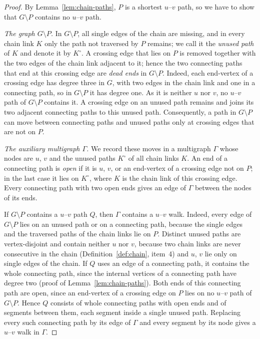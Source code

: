 \begin{proof}
By Lemma~\ref{lem:chain-paths}, $P$ is a shortest $u$--$v$ path, so we have to show that $G\setminus P$ contains no $u$--$v$ path.

\emph{The graph $G \setminus P$.}
In $G \setminus P$, all single edges of the chain are missing, and in every chain link $K$ only the path not traversed by $P$ remains; we call it the \emph{unused path} of $K$ and denote it by $K^{\circ}$.
A crossing edge that lies on $P$ is removed together with the two edges of the chain link adjacent to it; hence the two connecting paths that end at this crossing edge are \emph{dead ends} in $G \setminus P$.
Indeed, each end-vertex of a crossing edge has degree three in $G$, with two edges in the chain link and one in a connecting path, so in $G \setminus P$ it has degree one.
As it is neither $u$ nor $v$, no $u$--$v$ path of $G \setminus P$ contains it.
A crossing edge on an unused path remains and joins its two adjacent connecting paths to this unused path.
Consequently, a path in $G \setminus P$ can move between connecting paths and unused paths only at crossing edges that are not on $P$.

\emph{The auxiliary multigraph $\Gamma$.}
We record these moves in a multigraph $\Gamma$ whose nodes are $u$, $v$ and the unused paths $K^{\circ}$ of all chain links $K$.
An end of a connecting path is \emph{open} if it is $u$, $v$, or an end-vertex of a crossing edge not on $P$; in the last case it lies on $K^{\circ}$, where $K$ is the chain link of this crossing edge.
Every connecting path with two open ends gives an edge of $\Gamma$ between the nodes of its ends.

If $G \setminus P$ contains a $u$--$v$ path $Q$, then $\Gamma$ contains a $u$--$v$ walk.
Indeed, every edge of $G \setminus P$ lies on an unused path or on a connecting path, because the single edges and the traversed paths of the chain links lie on $P$.
Distinct unused paths are vertex-disjoint and contain neither $u$ nor $v$, because two chain links are never consecutive in the chain (Definition~\ref{def:chain}, item~4) and $u$, $v$ lie only on single edges of the chain.
If $Q$ uses an edge of a connecting path, it contains the whole connecting path, since the internal vertices of a connecting path have degree two (proof of Lemma~\ref{lem:chain-paths}).
Both ends of this connecting path are open, since an end-vertex of a crossing edge on $P$ lies on no $u$--$v$ path of $G \setminus P$.
Hence $Q$ consists of whole connecting paths with open ends and of segments between them, each segment inside a single unused path.
Replacing every such connecting path by its edge of $\Gamma$ and every segment by its node gives a $u$--$v$ walk in $\Gamma$.


\end{proof}

